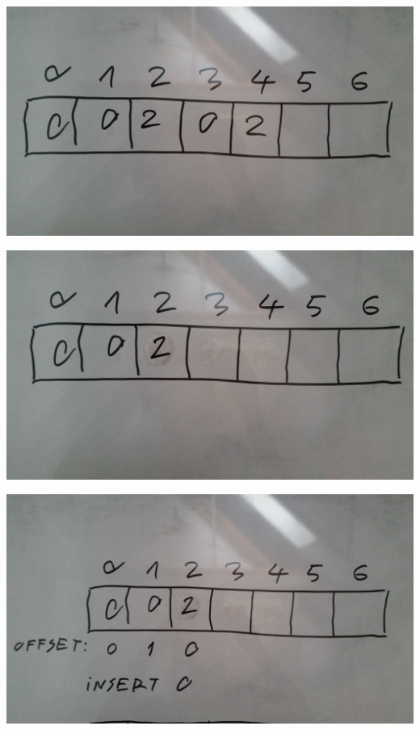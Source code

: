 \documentclass{beamer}
\begin{document}
\begin{frame}
 \begin{center}
 \includegraphics[scale=0.06,keepaspectratio=true]{./images/2.jpg}
 \end{center}
\end{frame}

\begin{frame}
 \begin{center}
 \includegraphics[scale=0.06,keepaspectratio=true]{./images/3.jpg}
 \end{center}
\end{frame}

\begin{frame}
 \begin{center}
 \includegraphics[scale=0.06,keepaspectratio=true]{./images/4.jpg}
 \end{center}
\end{frame}
\end{document}
